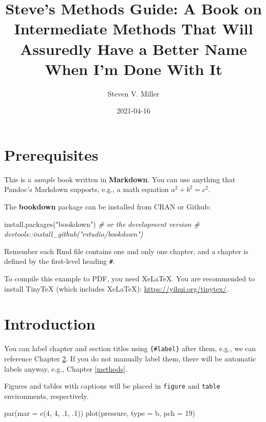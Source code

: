 \documentclass[
]{book}
\title{Steve's Methods Guide: A Book on Intermediate Methods That Will Assuredly Have a Better Name When I'm Done With It}
\author{Steven V. Miller}
\date{2021-04-16}
\newenvironment{Shaded}{\begin{snugshade}}{\end{snugshade}}
\newcommand{\AttributeTok}[1]{\textcolor[rgb]{0.77,0.63,0.00}{#1}}
\newcommand{\CommentTok}[1]{\textcolor[rgb]{0.56,0.35,0.01}{\textit{#1}}}
\newcommand{\DecValTok}[1]{\textcolor[rgb]{0.00,0.00,0.81}{#1}}
\newcommand{\FunctionTok}[1]{\textcolor[rgb]{0.00,0.00,0.00}{#1}}
\newcommand{\NormalTok}[1]{#1}
\newcommand{\StringTok}[1]{\textcolor[rgb]{0.31,0.60,0.02}{#1}}
\begin{document}
\maketitle

{
\setcounter{tocdepth}{1}
\tableofcontents
}
\hypertarget{prerequisites}{%
\chapter{Prerequisites}\label{prerequisites}}

This is a \emph{sample} book written in \textbf{Markdown}. You can use anything that Pandoc's Markdown supports, e.g., a math equation \(a^2 + b^2 = c^2\).

The \textbf{bookdown} package can be installed from CRAN or Github:

\begin{Shaded}
\begin{Highlighting}[]
\FunctionTok{install.packages}\NormalTok{(}\StringTok{"bookdown"}\NormalTok{)}
\CommentTok{\# or the development version}
\CommentTok{\# devtools::install\_github("rstudio/bookdown")}
\end{Highlighting}
\end{Shaded}

Remember each Rmd file contains one and only one chapter, and a chapter is defined by the first-level heading \texttt{\#}.

To compile this example to PDF, you need XeLaTeX. You are recommended to install TinyTeX (which includes XeLaTeX): \url{https://yihui.org/tinytex/}.

\hypertarget{intro}{%
\chapter{Introduction}\label{intro}}

You can label chapter and section titles using \texttt{\{\#label\}} after them, e.g., we can reference Chapter \ref{intro}. If you do not manually label them, there will be automatic labels anyway, e.g., Chapter \ref{methods}.

Figures and tables with captions will be placed in \texttt{figure} and \texttt{table} environments, respectively.

\begin{Shaded}
\begin{Highlighting}[]
\FunctionTok{par}\NormalTok{(}\AttributeTok{mar =} \FunctionTok{c}\NormalTok{(}\DecValTok{4}\NormalTok{, }\DecValTok{4}\NormalTok{, .}\DecValTok{1}\NormalTok{, .}\DecValTok{1}\NormalTok{))}
\FunctionTok{plot}\NormalTok{(pressure, }\AttributeTok{type =} \StringTok{\textquotesingle{}b\textquotesingle{}}\NormalTok{, }\AttributeTok{pch =} \DecValTok{19}\NormalTok{)}
\end{Highlighting}
\end{Shaded}
\end{document}
